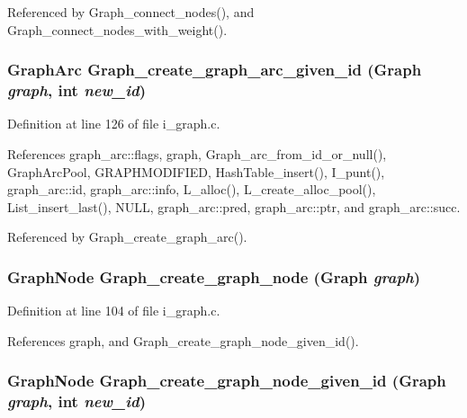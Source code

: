 Referenced by Graph\_\-connect\_\-nodes(), and Graph\_\-connect\_\-nodes\_\-with\_\-weight().
\subsubsection{\setlength{\rightskip}{0pt plus 5cm}\bf{Graph\-Arc} Graph\_\-create\_\-graph\_\-arc\_\-given\_\-id (\bf{Graph} {\em graph}, int {\em new\_\-id})}\label{i__graph_8h_c8565f77e3e329b5e006cc410ae0967c}




Definition at line 126 of file i\_\-graph.c.

References graph\_\-arc::flags, graph, Graph\_\-arc\_\-from\_\-id\_\-or\_\-null(), Graph\-Arc\-Pool, GRAPHMODIFIED, Hash\-Table\_\-insert(), I\_\-punt(), graph\_\-arc::id, graph\_\-arc::info, L\_\-alloc(), L\_\-create\_\-alloc\_\-pool(), List\_\-insert\_\-last(), NULL, graph\_\-arc::pred, graph\_\-arc::ptr, and graph\_\-arc::succ.

Referenced by Graph\_\-create\_\-graph\_\-arc().
\subsubsection{\setlength{\rightskip}{0pt plus 5cm}\bf{Graph\-Node} Graph\_\-create\_\-graph\_\-node (\bf{Graph} {\em graph})}\label{i__graph_8h_23fe203e14349c2875bb285f0727cc2d}




Definition at line 104 of file i\_\-graph.c.

References graph, and Graph\_\-create\_\-graph\_\-node\_\-given\_\-id().
\subsubsection{\setlength{\rightskip}{0pt plus 5cm}\bf{Graph\-Node} Graph\_\-create\_\-graph\_\-node\_\-given\_\-id (\bf{Graph} {\em graph}, int {\em new\_\-id})}\label{i__graph_8h_3ec162de5f8931740e3497fa03eb8d17}




